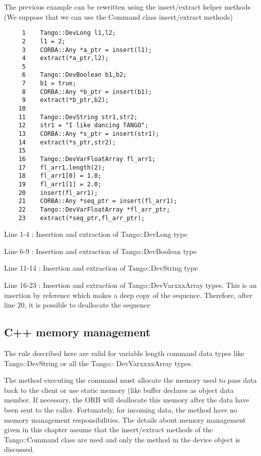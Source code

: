 The previous example can be rewritten using the insert/extract helper
methods (We suppose that we can use the Command class insert/extract
methods)


\begin{verbatim}
     1    Tango::DevLong l1,l2;
     2    l1 = 2;
     3    CORBA::Any *a_ptr = insert(l1);
     4    extract(*a_ptr,l2);
     5  
     6    Tango::DevBoolean b1,b2;
     7    b1 = true;
     8    CORBA::Any *b_ptr = insert(b1);
     9    extract(*b_ptr,b2);
    10  
    11    Tango::DevString str1,str2;
    12    str1 = "I like dancing TANGO";
    13    CORBA::Any *s_ptr = insert(str1);
    14    extract(*s_ptr,str2);
    15  
    16    Tango::DevVarFloatArray fl_arr1;
    17    fl_arr1.length(2);
    18    fl_arr1[0] = 1.0;
    19    fl_arr1[1] = 2.0;
    20    insert(fl_arr1);
    21    CORBA::Any *seq_ptr = insert(fl_arr1);
    22    Tango::DevVarFloatArray *fl_arr_ptr;
    23    extract(*seq_ptr,fl_arr_ptr);
\end{verbatim}


Line 1-4 : Insertion and extraction of Tango::DevLong type

Line 6-9 : Insertion and extraction of Tango::DevBoolean type 

Line 11-14 : Insertion and extraction of Tango::DevString type

Line 16-23 : Insertion and extraction of Tango::DevVarxxxArray types.
This is an insertion by reference which makes a deep copy of the sequence.
Therefore, after line 20, it is possible to deallocate the sequence


\subsection{C++ memory management}

The rule described here are valid for variable length command data
types like Tango::DevString or all the Tango:: DevVarxxxxArray types.

The method executing the command must allocate the memory used to
pass data back to the client or use static memory (like buffer declares
as object data member. If necessary, the ORB will deallocate this
memory after the data have been sent to the caller. Fortunately, for
incoming data, the method have no memory management
responsibilities. The details about memory management given in this
chapter assume that the insert/extract methods of the Tango::Command
class are used and only the method in the device object is discussed.


